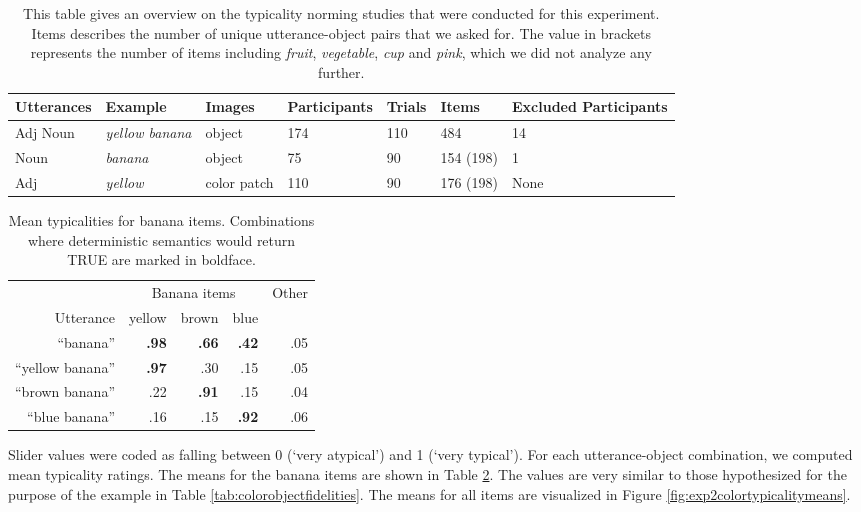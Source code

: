 \documentclass[11pt]{article}
\newcommand{\tableref}[1]{Table \ref{#1}}
\newcommand{\figref}[1]{Figure \ref{#1}}
\begin{document}
\begin{table}[bt!]
	\begin{tabular}{l l l l l l l}
		\toprule
		Utterances & Example & Images & Participants & Trials & Items & Excluded Participants\\
		\midrule
		Adj Noun & \emph{yellow banana} & object & 174 & 110 & 484 & 14\\ 
		Noun & \emph{banana} & object & 75 & 90 & 154 (198) & 1\\
		Adj & \emph{yellow} & color patch & 110 & 90 & 176 (198) & None\\
		\bottomrule
	\end{tabular}
	\vspace{2mm}
	\caption{This table gives an overview on the typicality norming studies that were conducted for this experiment. Items describes the number of unique utterance-object pairs that we asked for. The value in brackets represents the number of items including \textit{fruit}, \textit{vegetable}, \textit{cup} and \textit{pink}, which we did not analyze any further.}
	\label{tab:normingoverview}
\end{table}

\begin{table}[bt!]
	\caption{Mean typicalities for banana items. Combinations where deterministic semantics would return TRUE are marked in boldface.}
\centering
	\begin{tabular}{r r r r r}
		\toprule
		& \multicolumn{3}{c}{Banana items} & Other \\
		Utterance & yellow & brown  & blue & \\ 
		\midrule
		``banana'' & \textbf{.98} & \textbf{.66} & \textbf{.42} & .05  \\
		\midrule
		``yellow banana'' & \textbf{.97} & .30 & .15 & .05 \\
		``brown banana'' & .22 & \textbf{.91} & .15 & .04\\
		``blue banana'' & .16 & .15 & \textbf{.92} & .06\\
		\bottomrule
	\end{tabular}
	\vspace{5mm}
	\label{tab:bananatypicalities}
\end{table}

Slider values were coded as falling between 0 (`very atypical') and 1 (`very typical'). 
For each utterance-object combination, we computed mean typicality ratings. The means for the banana items are shown in \tableref{tab:bananatypicalities}. The values are very similar to those hypothesized for the purpose of the example in \tableref{tab:colorobjectfidelities}. The means for all items are visualized in \figref{fig:exp2colortypicalitymeans}.
\end{document}
